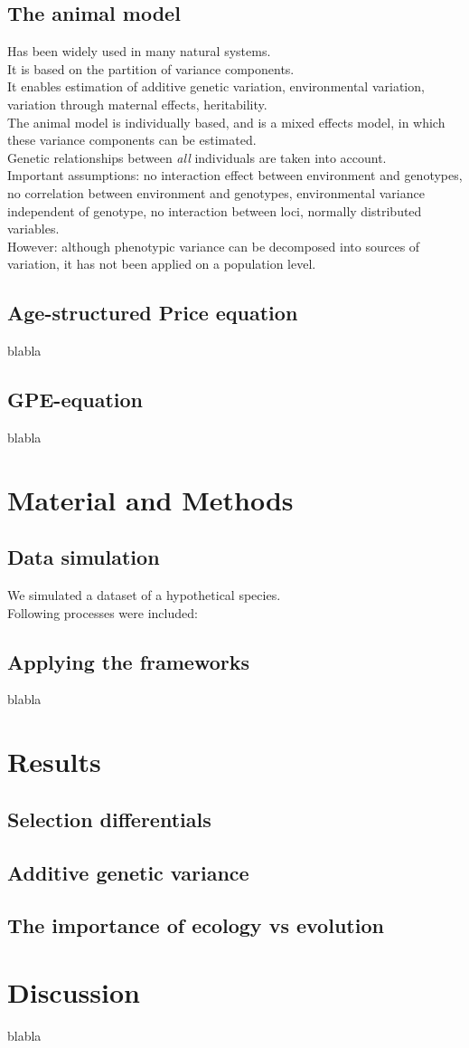 \documentclass{article}
\begin{document}
\subsection*{The animal model}
Has been widely used in many natural systems.\\
It is based on the partition of variance components.\\
It enables estimation of additive genetic variation, environmental variation, variation through maternal effects, heritability. \\
The animal model is individually based, and is a mixed effects model, in which these variance components can be estimated.\\
Genetic relationships between \emph{all} individuals are taken into account.\\
Important assumptions: no interaction effect between environment and genotypes, no correlation between environment and genotypes, environmental variance independent of genotype, no interaction between loci, normally distributed variables. \\
However: although phenotypic variance can be decomposed into sources of variation, it has not been applied on a population level.

\subsection*{Age-structured Price equation}
blabla
\subsection*{GPE-equation}
blabla

\section*{Material and Methods}
\subsection*{Data simulation}
We simulated a dataset of a hypothetical species. \\
Following processes were included: 

\subsection*{Applying the frameworks}
blabla

\section*{Results}
\subsection*{Selection differentials}
\subsection*{Additive genetic variance}
\subsection*{The importance of ecology vs evolution}

\section*{Discussion}
blabla
\end{document}
